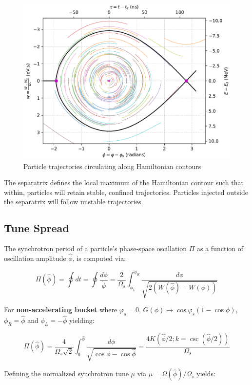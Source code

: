 \begin{figure}
    \centering
    \includegraphics{figs/single_particle_motion/trajectories.pdf}
    \caption{Particle trajectories circulating along Hamiltonian contours}
    \label{fig:fisheye}
\end{figure}

The separatrix defines the local maximum of the Hamiltonian contour such that within, particles will retain stable, confined trajectories. Particles injected outside the separatrix will follow unstable trajectories.

\subsection{Tune Spread}

The synchrotron period of a particle's phase-space oscillation $\Pi$ as a function of oscillation amplitude $\hat{\phi}$, is computed via:

$$\Pi(\hat{\phi}) = \oint dt = \oint \frac{d\phi}{\dot{\phi}} = \frac{2}{\Omega_s}\int_{\phi_L}^{\phi_R} \frac{d\phi}{\sqrt{2(W(\hat{\phi})-W(\phi))}}$$

For \textbf{non-accelerating bucket} where $\varphi_s = 0$, $G(\phi) \to \cos\varphi_s(1-\cos\phi)$, $\phi_R = \hat{\phi}$ and $\phi_L = -\hat{\phi}$ yielding:

$$\Pi(\hat{\phi}) = \frac{4}{\Omega_s\sqrt{2}}\int_0^{\hat{\phi}}\frac{d\phi}{\sqrt{\cos\phi-\cos\hat{\phi}}} = \frac{4K(\hat{\phi}/2; k=\csc(\hat{\phi}/2))}{\Omega_s}$$

Defining the normalized synchrotron tune $\mu$ via $\mu = \Omega(\hat{\phi})/\Omega_s$ yields:

